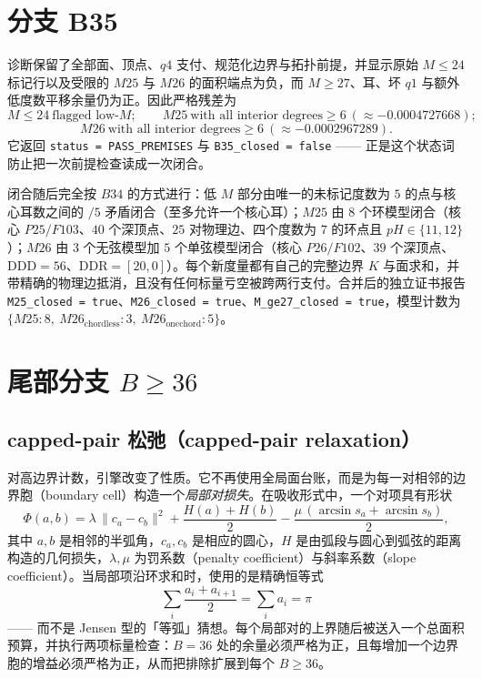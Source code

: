 \section{分支 B35}

诊断保留了全部面、顶点、$q4$ 支付、规范化边界与拓扑前提，并显示原始 $M\le24$ 标记行以及受限的 $M25$ 与 $M26$ 的面积端点为负，而 $M\ge27$、耳、坏 $q1$ 与额外低度数平移余量仍为正。因此严格残差为
\[
M\le24\ \text{flagged low-}M;\qquad M25\ \text{with all interior degrees}\ge6\ (\approx-0.0004727668);
\]
\[
M26\ \text{with all interior degrees}\ge6\ (\approx-0.0002967289).
\]
它返回 \texttt{status = PASS\_\allowbreak{}PREMISES} 与 \texttt{B35\_\allowbreak{}closed = false} —— 正是这个状态词防止把一次前提检查读成一次闭合。

闭合随后完全按 $B34$ 的方式进行：低 $M$ 部分由唯一的未标记度数为 $5$ 的点与核心耳数之间的 $/5$ 矛盾闭合（至多允许一个核心耳）；$M25$ 由 $8$ 个环模型闭合（核心 $P25/F103$、$40$ 个深顶点、$25$ 对物理边、四个度数为 $7$ 的环点且 $pH\in\{11,12\}$）；$M26$ 由 $3$ 个无弦模型加 $5$ 个单弦模型闭合（核心 $P26/F102$、$39$ 个深顶点、$\mathrm{DDD}=56$、$\mathrm{DDR}=[20,0]$）。每个新度量都有自己的完整边界 $K$ 与面求和，并带精确的物理边抵消，且没有任何标量亏空被跨两行支付。合并后的独立证书报告 \texttt{M25\_\allowbreak{}closed = true}、\texttt{M26\_\allowbreak{}closed = true}、\texttt{M\_\allowbreak{}ge27\_\allowbreak{}closed = true}，模型计数为 $\{M25:8,\ M26_{\text{chordless}}:3,\
M26_{\text{onechord}}:5\}$。

\section{尾部分支 $B\ge36$}

\subsection{capped-pair 松弛（capped-pair relaxation）}

对高边界计数，引擎改变了性质。它不再使用全局面台账，而是为每一对相邻的边界胞（boundary cell）构造一个\emph{局部对损失}。在吸收形式中，一个对项具有形状
\[
\Phi(a,b)=\lambda\,\|c_a-c_b\|^2+\frac{H(a)+H(b)}{2}-\frac{\mu\,(\arcsin s_a+\arcsin s_b)}{2},
\]
其中 $a,b$ 是相邻的半弧角，$c_a,c_b$ 是相应的圆心，$H$ 是由弧段与圆心到弧弦的距离构造的几何损失，$\lambda,\mu$ 为罚系数（penalty coefficient）与斜率系数（slope coefficient）。当局部项沿环求和时，使用的是精确恒等式
\[
\sum_i\frac{a_i+a_{i+1}}2=\sum_i a_i=\pi
\]
—— 而不是 Jensen 型的「等弧」猜想。每个局部对的上界随后被送入一个总面积预算，并执行两项标量检查：$B=36$ 处的余量必须严格为正，且每增加一个边界胞的增益必须严格为正，从而把排除扩展到每个 $B\ge36$。

